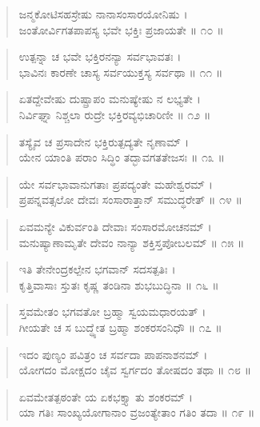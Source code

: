 \begin{verse}
ಜನ್ಮಕೋಟಿಸಹಸ್ರೇಷು ನಾನಾಸಂಸಾರಯೋನಿಷು ।\\ಜಂತೋರ್ವಿಗತಪಾಪಸ್ಯ ಭವೇ ಭಕ್ತಿಃ ಪ್ರಜಾಯತೇ \num{॥ ೧೦ ॥}
\end{verse}

\begin{verse}
ಉತ್ಪನ್ನಾ ಚ ಭವೇ ಭಕ್ತಿರನನ್ಯಾ ಸರ್ವಭಾವತಃ ।\\ಭಾವಿನಃ ಕಾರಣೇ ಚಾಸ್ಯ ಸರ್ವಯುಕ್ತಸ್ಯ ಸರ್ವಥಾ \num{॥ ೧೧ ॥}
\end{verse}

\begin{verse}
ಏತದ್ದೇವೇಷು ದುಷ್ಪ್ರಾಪಂ ಮನುಷ್ಯೇಷು ನ ಲಭ್ಯತೇ ।\\ನಿರ್ವಿಘ್ನಾ ನಿಶ್ಚಲಾ ರುದ್ರೇ ಭಕ್ತಿರವ್ಯಭಿಚಾರಿಣೀ \num{॥ ೧೨ ॥}
\end{verse}

\begin{verse}
ತಸ್ಯೈವ ಚ ಪ್ರಸಾದೇನ ಭಕ್ತಿರುತ್ಪದ್ಯತೇ ನೃಣಾಮ್ ।\\ಯೇನ ಯಾಂತಿ ಪರಾಂ ಸಿದ್ಧಿಂ ತದ್ಭಾವಗತತೇಜಸಃ \num{॥ ೧೩ ॥}
\end{verse}

\begin{verse}
ಯೇ ಸರ್ವಭಾವಾನುಗತಾಃ ಪ್ರಪದ್ಯಂತೇ ಮಹೇಶ್ವರಮ್ ।\\ಪ್ರಪನ್ನವತ್ಸಲೋ ದೇವಃ ಸಂಸಾರಾತ್ತಾನ್ ಸಮುದ್ಧರೇತ್ \num{॥ ೧೪ ॥}
\end{verse}

\begin{verse}
ಏವಮನ್ಯೇ ವಿಕುರ್ವಂತಿ ದೇವಾಃ ಸಂಸಾರಮೋಚನಮ್ ।\\ಮನುಷ್ಯಾಣಾಮೃತೇ ದೇವಂ ನಾನ್ಯಾ ಶಕ್ತಿಸ್ತಪೋಬಲಮ್ \num{॥ ೧೫ ॥}
\end{verse}

\begin{verse}
ಇತಿ ತೇನೇಂದ್ರಕಲ್ಪೇನ ಭಗವಾನ್ ಸದಸತ್ಪತಿಃ ।\\ಕೃತ್ತಿವಾಸಾಃ ಸ್ತುತಃ ಕೃಷ್ಣ ತಂಡಿನಾ ಶುಭಬುದ್ಧಿನಾ \num{॥ ೧೬ ॥}
\end{verse}

\begin{verse}
ಸ್ತವಮೇತಂ ಭಗವತೋ ಬ್ರಹ್ಮಾ ಸ್ವಯಮಧಾರಯತ್ ।\\ಗೀಯತೇ ಚ ಸ ಬುದ್ಧ್ಯೇತ ಬ್ರಹ್ಮಾ ಶಂಕರಸಂನಿಧೌ \num{॥ ೧೭ ॥}
\end{verse}

\begin{verse}
ಇದಂ ಪುಣ್ಯಂ ಪವಿತ್ರಂ ಚ ಸರ್ವದಾ ಪಾಪನಾಶನಮ್ ।\\ಯೋಗದಂ ಮೋಕ್ಷದಂ ಚೈವ ಸ್ವರ್ಗದಂ ತೋಷದಂ ತಥಾ \num{॥ ೧೮ ॥}
\end{verse}

\begin{verse}
ಏವಮೇತತ್ಪಠಂತೇ ಯ ಏಕಭಕ್ತ್ಯಾ ತು ಶಂಕರಮ್ ।\\ಯಾ ಗತಿಃ ಸಾಂಖ್ಯಯೋಗಾನಾಂ ವ್ರಜಂತ್ಯೇತಾಂ ಗತಿಂ ತದಾ \num{॥ ೧೯ ॥}
\end{verse}


